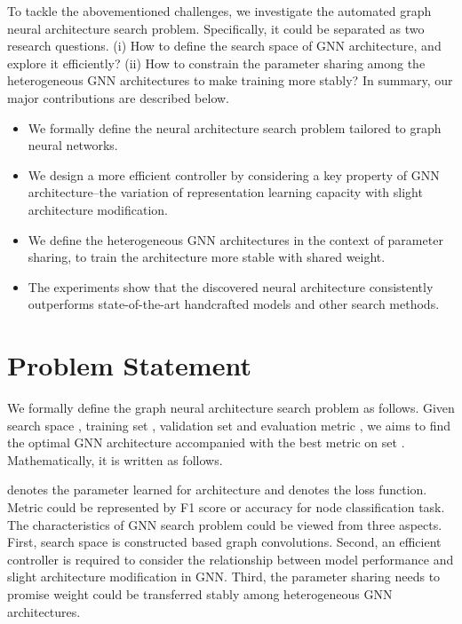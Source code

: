 \documentclass[sigconf]{acmart}
\begin{document}
To tackle the abovementioned challenges, we investigate the automated graph neural architecture search problem. Specifically, it could be separated as two research questions. (i) How to define the search space of GNN architecture, and explore it efficiently? (ii) How to constrain the parameter sharing among the heterogeneous GNN architectures to make training more stably? In summary, our major contributions are described below. 


\begin{itemize}
    \item We formally define the neural architecture search problem tailored to graph neural networks.
    


\item We design a more efficient controller by considering a key property of GNN architecture--the variation of representation learning capacity with slight architecture modification.
    \item We define the heterogeneous GNN architectures in the context of parameter sharing, to train the architecture more stable with shared weight. 
\item The experiments show that the discovered neural architecture consistently outperforms state-of-the-art handcrafted models and other search methods.
\end{itemize}

\section{Problem Statement}
We formally define the graph neural architecture search problem as follows.
Given search space , training set , validation set  and evaluation metric , we aims to find the optimal GNN architecture  accompanied with the best metric  on set . Mathematically, it is written as follows.

 denotes the parameter learned for architecture  and  denotes the loss function. Metric  could be represented by F1 score or accuracy for node classification task. The characteristics of GNN search problem could be viewed from three aspects. First, search space  is constructed based graph convolutions. Second, an efficient controller is required to consider the relationship between model performance and slight architecture modification in GNN. Third, the parameter sharing needs to promise weight could be transferred stably among heterogeneous GNN architectures. 
\end{document}
